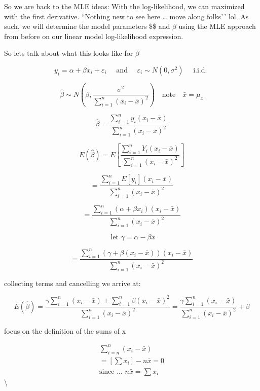 \documentclass[
  12 pt,
  a4paper,
]{book}
\numberwithin{equation}{section}
\theoremstyle{plain}      %
\theoremstyle{definition} %
\theoremstyle{remark}     %
\theoremstyle{note}         %
\begin{document}
So we are back to the MLE ideas: With the log-likelihood, we can
maximized with the first derivative. ``Nothing new to see here \ldots{}
move along folks'\,' lol. As such, we will determine the model
parameters \$\alpha \$ and \(\beta\) using the MLE approach from before
on our linear model log-likelihood expression.

So lets talk about what this looks like for \(\beta\)

\[
y_{i}=\alpha+\beta x_{i}+\varepsilon_{i} \quad \text{ and } \quad
\varepsilon_{i} \sim  N\left(0,\sigma^{2}\right) \quad \text{ i.i.d. }
\]

\[
\hat{\beta} \sim N\left(\beta, \frac{\sigma^{2}}{\sum_{i=1}^{n}\left(x_{i}-\bar{x}\right)^{2}}\right) \quad \text{note} \quad \bar{x}=\mu_{x}
\]

\[
\hat{\beta}=\frac{\sum_{i=1}^{n} y_{i}\left(x_{i}-\bar{x}\right)}{\sum_{i=1}^{n}\left(x_{i}-\bar{x}\right)^{2}}
\]

\[
E(\hat{\beta})=E\left[\frac{\sum_{i=1}^{n} Y_{i}\left(x_{i}-\bar{x}\right)}{\sum_{i=1}^{n}\left(x_{i}-\bar{x}\right)^{2}}\right]
\]

\[
=\frac{\sum_{i=1}^{n}E[y_{i}]\left(x_{i}-\bar{x}\right)}{\sum_{i=1}^{n}\left(x_{i}-\bar{x}\right)^{2}}
\]

\[
=\frac{\sum_{i=1}^{n} \left(\alpha+\beta x_{i} \right)\left(x_{i}-\bar{x}\right)}{\sum_{i=1}^{n}\left(x_{i}-\bar{x}\right)^{2}}
\]

\[
\text { let } \gamma=\alpha-\beta \bar{x}
\]

\[
=\frac{\sum_{i=1}^{n}\left(\gamma+\beta\left(x_{i}-\bar{x}\right)\right)\left(x_{i}-\bar{x}\right)}{\sum_{i=1}^{n}\left(x_{i}-\bar{x}\right)^{2}}
\]

collecting terms and cancelling we arrive at:

\[
E(\hat{\beta})=\frac{\gamma \sum_{i=1}^{n}\left(x_{i}-\bar{x}\right)+\sum_{i=1}^{n} \beta\left(x_{i}-\bar{x}\right)^{2}}{\sum_{i=1}^{n}\left(x_{i}-\bar{x}\right)^{2}} =\frac{\gamma \sum_{i=1}^{n}\left(x_{i}-\bar{x}\right)}{\sum_{i=1}^{n}\left(x_{i}-\bar{x}\right)^{2}}+\beta
\]

focus on the definition of the sums of x

\[
\begin{gathered}
\sum_{i=n}^{n}\left(x_{i}-\bar{x}\right) \\
=\left[\sum x_{i}\right]-n \bar{x} = 0 \\
\text{since ... }
n \bar{x}=\sum x_{i}
\end{gathered}
\]\textbackslash{}
\end{document}
